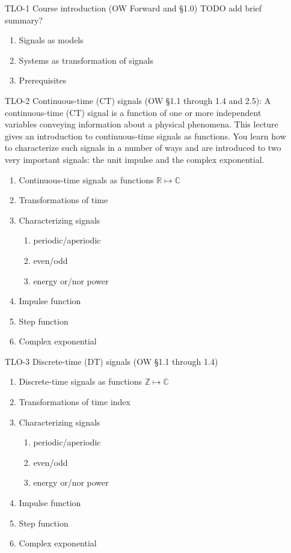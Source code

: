 \begin{enumerate}
\item[TLO-1] Course introduction (OW Forward and \S 1.0) TODO add brief summary?
  \begin{enumerate}
  \item Signals as models
  \item Systems as transformation of signals
  \item Prerequisites
  \end{enumerate}

\item[TLO-2] Continuous-time (CT) signals (OW \S 1.1 through 1.4 and 2.5): A continuous-time (CT) signal  is a function of one or more independent variables conveying information about a physical phenomena. This lecture gives an introduction to continuous-time signals as functions. You learn how to characterize such signals in a number of ways and are introduced to two very important signals: the unit impulse and the complex exponential.
  \begin{enumerate}
  \item Continuous-time signals as functions $\mathbb{R}\mapsto\mathbb{C}$
  \item Transformations of time
  \item Characterizing signals
    \begin{enumerate}
    \item periodic/aperiodic
    \item even/odd
    \item energy or/nor power
    \end{enumerate}
  \item Impulse function
  \item Step function
  \item Complex exponential
  \end{enumerate}

\item[TLO-3] Discrete-time (DT) signals (OW \S 1.1 through 1.4)
  \begin{enumerate}
  \item Discrete-time signals as functions $\mathbb{Z}\mapsto\mathbb{C}$
  \item Transformations of time index
  \item Characterizing signals
    \begin{enumerate}
    \item periodic/aperiodic
    \item even/odd
    \item energy or/nor power
    \end{enumerate}
  \item Impulse function
  \item Step function
  \item Complex exponential
  \end{enumerate}


\end{enumerate}
